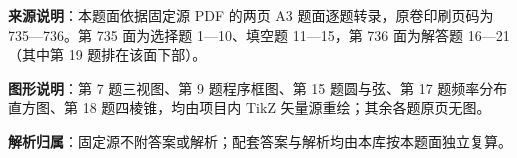 

\begin{gknotice}
\textbf{来源说明}：本题面依据固定源 PDF 的两页 A3 题面逐题转录，原卷印刷页码为 735—736。第 735 面为选择题 1—10、填空题 11—15，第 736 面为解答题 16—21（其中第 19 题排在该面下部）。

\textbf{图形说明}：第 7 题三视图、第 9 题程序框图、第 15 题圆与弦、第 17 题频率分布直方图、第 18 题四棱锥，均由项目内 TikZ 矢量源重绘；其余各题原页无图。

\textbf{解析归属}：固定源不附答案或解析；配套答案与解析均由本库按本题面独立复算。
\end{gknotice}


